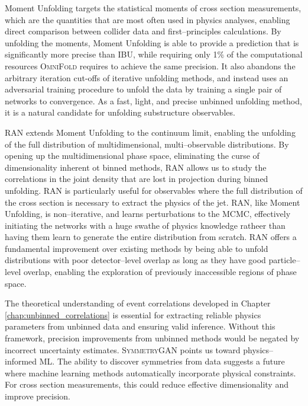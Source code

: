         Moment Unfolding targets the statistical moments of cross section measurements, which are the quantities that are most often used in physics analyses, enabling direct comparison between collider data and first--principles calculations.
        By unfolding the moments, Moment Unfolding is able to provide a prediction that is significantly more precise than IBU, while requiring only 1\(\%\) of the computational resources \textsc{OmniFold} requires to achieve the same precision.
        It also abandons the arbitrary iteration cut-offs of iterative unfolding methods, and instead uses an adversarial training procedure to unfold the data by training a single pair of networks to convergence.
        As a fast, light, and precise unbinned unfolding method, it is a natural candidate for unfolding substructure observables.
        
        RAN extends Moment Unfolding to the continuum limit, enabling the unfolding of the full distribution of multidimensional, multi--observable distributions.
        By opening up the multidimensional phase space, eliminating the curse of dimensionality inherent ot binned methods, RAN allows us to study the correlations in the joint density that are lost in projection during binned unfolding.
        RAN is particularly useful for observables where the full distribution of the cross section is necessary to extract the physics of the jet.
        RAN, like Moment Unfolding, is non--iterative, and learns perturbations to the MCMC, effectively initiating the networks with a huge swathe of physics knowledge ratheer than having them learn to generate the entire distribution from scratch.
        RAN offers a fundamental improvement over existing methods by being able to unfold distributions with poor detector--level overlap as long as they have good particle--level overlap, enabling the exploration of previously inaccessible regions of phase space.
        
        The theoretical understanding of event correlations developed in Chapter \ref{chap:unbinned_correlations} is essential for extracting reliable physics parameters from unbinned data and ensuring valid inference.
        Without this framework, precision improvements from unbinned methods would be negated by incorrect uncertainty estimates.
        \textsc{SymmetryGAN} points us toward physics--informed ML.
        The ability to discover symmetries from data suggests a future where machine learning methods automatically incorporate physical constraints.
        For cross section measurements, this could reduce effective dimensionality and improve precision.
    
